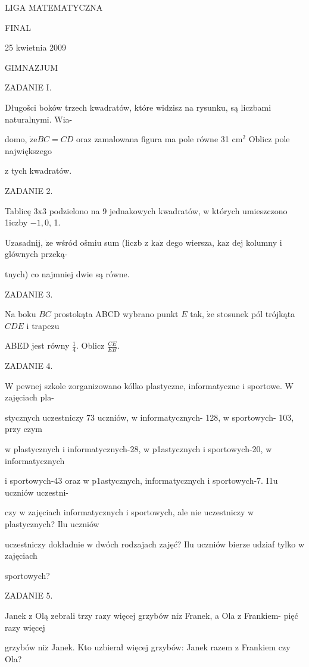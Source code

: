 \documentclass[a4paper,12pt]{article}
\begin{document}
LIGA MATEMATYCZNA

FINAL

25 kwietnia 2009

GIMNAZJUM

ZADANIE I.

Długošci boków trzech kwadratów, które widzisz na rysunku, są liczbami naturalnymi. Wia-

domo, $\dot{\mathrm{z}}\mathrm{e}BC=CD$ oraz zamalowana figura ma pole równe 31 $\mathrm{c}\mathrm{m}^{2}$ Oblicz pole największego

z tych kwadratów.

ZADANIE 2.

Tablicę $3\mathrm{x}3$ podzielono na 9 jednakowych kwadratów, w których umieszczono 1iczby $-1, 0$, 1.

Uzasadnij, $\dot{\mathrm{z}}\mathrm{e}$ wśród ošmiu sum (liczb z $\mathrm{k}\mathrm{a}\dot{\mathrm{z}}$ dego wiersza, $\mathrm{k}\mathrm{a}\dot{\mathrm{z}}$ dej kolumny i glównych przeką-

tnych) co najmniej dwie są równe.

ZADANIE 3.

Na boku $BC$ prostokąta ABCD wybrano punkt $E$ tak, $\dot{\mathrm{z}}\mathrm{e}$ stosunek pól trójkąta $CDE$ i trapezu

ABED jest równy $\displaystyle \frac{1}{4}$. Oblicz $\displaystyle \frac{CE}{EB}.$

ZADANIE 4.

$\mathrm{W}$ pewnej szkole zorganizowano kólko plastyczne, informatyczne i sportowe. $\mathrm{W}$ zajęciach pla-

stycznych uczestniczy 73 uczniów, w informatycznych- 128, w sportowych- 103, przy czym

w plastycznych i informatycznych-28, w p1astycznych i sportowych-20, w informatycznych

i sportowych-43 oraz w p1astycznych, informatycznych i sportowych-7. I1u uczniów uczestni-

czy w zajęciach informatycznych i sportowych, ale nie uczestniczy w plastycznych? Ilu uczniów

uczestniczy dokładnie w dwóch rodzajach zajęć? Ilu uczniów bierze udziaf tylko w zajęciach

sportowych?

ZADANIE 5.

Janek z Olą zebrali trzy razy więcej grzybów $\mathrm{n}\mathrm{i}\dot{\mathrm{z}}$ Franek, a Ola z Frankiem- pięć razy więcej

grzybów $\mathrm{n}\mathrm{i}\dot{\mathrm{z}}$ Janek. Kto uzbierał więcej grzybów: Janek razem z Frankiem czy Ola?
\end{document}
